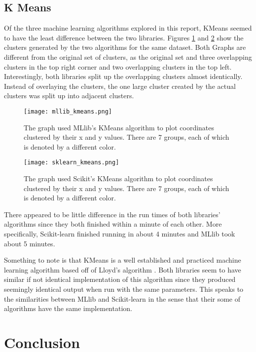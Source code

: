 \documentclass[9pt,twocolumn,twoside]{idsi}
\begin{document}
\subsection{K Means}
Of the three machine learning algorithms explored in this report, KMeans seemed to have the least difference between the two libraries. Figures \ref{fig:mllib_clusters} and \ref{fig:sklearn_clusters} show the clusters generated by the two algorithms for the same dataset. Both Graphs are different from the original set of clusters, as the original set and three overlapping clusters in the top right corner and two overlapping clusters in the top left. Interestingly, both libraries split up the overlapping clusters almost identically. Instead of overlaying the clusters, the one large cluster created by the actual clusters was split up into adjacent clusters.

\begin{figure}[htbp]
\centering
\texttt{[image: mllib\_kmeans.png]}
\caption{The graph used MLlib's KMeans algorithm to plot coordinates clustered by their x and y values. There are 7 groups, each of which is denoted by a different color.}
\label{fig:mllib_clusters}
\end{figure}

\begin{figure}[htbp]
\centering
\texttt{[image: sklearn\_kmeans.png]}
\caption{The graph used Scikit's KMeans algorithm to plot coordinates clustered by their x and y values. There are 7 groups, each of which is denoted by a different color.}
\label{fig:sklearn_clusters}
\end{figure}

There appeared to be little difference in the run times of both libraries' algorithms since they both finished within a minute of each other. More specifically, Scikit-learn finished running in about 4 minutes and MLlib took about 5 minutes. 

Something to note is that KMeans is a well established and practiced machine learning algorithm based off of Lloyd's algorithm \cite{clustering}. Both libraries seem to have similar if not identical implementation of this algorithm since they produced seemingly identical output when run with the same parameters. This speaks to the similarities between MLlib and Scikit-learn in the sense that their some of algorithms have the same implementation.
 
\section{Conclusion}
\end{document}
